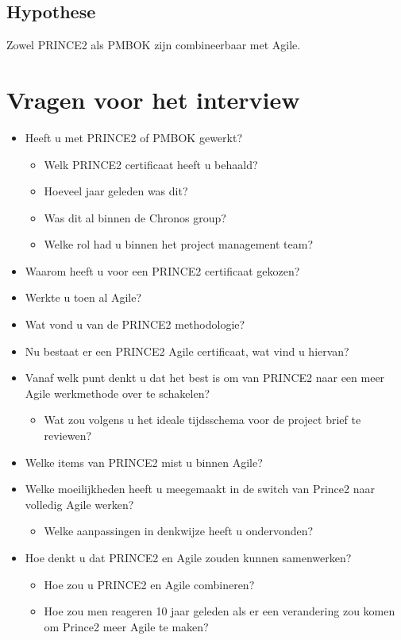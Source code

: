 \documentclass[]{article}
\begin{document}
\subsection{Hypothese}
Zowel PRINCE2 als PMBOK zijn combineerbaar met Agile.

\section{Vragen voor het interview}
\begin{itemize}
	\item Heeft u met PRINCE2 of PMBOK gewerkt?
	\begin{itemize}
		\item Welk PRINCE2 certificaat heeft u behaald?
		\item Hoeveel jaar geleden was dit?
		\item Was dit al binnen de Chronos group?
		\item Welke rol had u binnen het project management team?
	\end{itemize}
	\item Waarom heeft u voor een PRINCE2 certificaat gekozen?
	\item Werkte u toen al Agile?
	\item Wat vond u van de PRINCE2 methodologie?
	\item Nu bestaat er een PRINCE2 Agile certificaat, wat vind u hiervan?
	\item Vanaf welk punt denkt u dat het best is om van PRINCE2 naar een meer Agile werkmethode over te schakelen?
	\begin{itemize}
		\item Wat zou volgens u het ideale tijdsschema voor de project brief te reviewen?
	\end{itemize}
	\item Welke items van PRINCE2 mist u binnen Agile?
	\item Welke moeilijkheden heeft u meegemaakt in de switch van Prince2 naar volledig Agile werken?
	\begin{itemize}
		\item Welke aanpassingen in denkwijze heeft u ondervonden?
	\end{itemize}
	\item Hoe denkt u dat PRINCE2 en Agile zouden kunnen samenwerken?
	\begin{itemize}
		\item Hoe zou u PRINCE2 en Agile combineren?
		\item Hoe zou men reageren 10 jaar geleden als er een verandering zou komen om Prince2 meer Agile te maken?
	\end{itemize}
\end{itemize}
\end{document}
